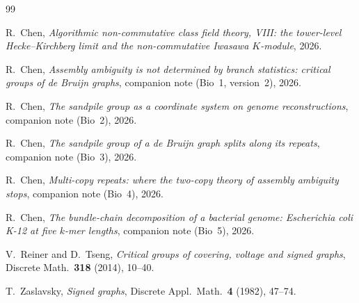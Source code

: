 \documentclass[11pt]{article}
\theoremstyle{plain}
\theoremstyle{definition}
\theoremstyle{remark}
\begin{document}
\begin{thebibliography}{99}

 R.~Chen, \emph{Algorithmic non-commutative class field theory, VIII: the
tower-level Hecke--Kirchberg limit and the non-commutative Iwasawa $K$-module}, 2026.

 R.~Chen, \emph{Assembly ambiguity is not determined by branch statistics:
critical groups of de Bruijn graphs}, companion note (Bio~1, version~2), 2026.

 R.~Chen, \emph{The sandpile group as a coordinate system on genome
reconstructions}, companion note (Bio~2), 2026.

 R.~Chen, \emph{The sandpile group of a de Bruijn graph splits along its
repeats}, companion note (Bio~3), 2026.

 R.~Chen, \emph{Multi-copy repeats: where the two-copy theory of assembly
ambiguity stops}, companion note (Bio~4), 2026.

 R.~Chen, \emph{The bundle-chain decomposition of a bacterial genome:
Escherichia coli K-12 at five $k$-mer lengths}, companion note (Bio~5), 2026.

 V.~Reiner and D.~Tseng, \emph{Critical groups of covering, voltage and signed
graphs}, Discrete Math.\ \textbf{318} (2014), 10--40.

 T.~Zaslavsky, \emph{Signed graphs}, Discrete Appl.\ Math.\ \textbf{4}
(1982), 47--74.

\end{thebibliography}
\end{document}
